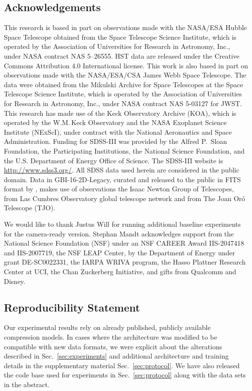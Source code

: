
\newpage

\subsection*{Acknowledgements}
This research is based in part on observations made with the NASA/ESA Hubble Space Telescope obtained from the Space Telescope Science Institute, which is operated by the Association of Universities for Research in Astronomy, Inc., under NASA contract NAS 5–26555. HST data are released under the Creative Commons Attribution 4.0 International license. This work is also based in part on observations made with the NASA/ESA/CSA James Webb Space Telescope. The data were obtained from the Mikulski Archive for Space Telescopes at the Space Telescope Science Institute, which is operated by the Association of Universities for Research in Astronomy, Inc., under NASA contract NAS 5-03127 for JWST. This research has made use of the Keck Observatory Archive (KOA), which is operated by the W.M.\,Keck Observatory and the NASA Exoplanet Science Institute (NExScI), under contract with the National Aeronautics and Space Administration. Funding for SDSS-III was provided by the Alfred P.\ Sloan Foundation, the Participating Institutions, the National Science Foundation, and the U.S. Department of Energy Office of Science. The SDSS-III website is \url{http://www.sdss3.org/}. All SDSS data used herein are considered in the public domain. Data in GBI-16-2D-Legacy, curated and released to the public in FITS format by \citet{maireles2023efficient}, makes use of observations the Isaac Newton Group of Telescopes, from Las Cumbres Observatory global telescope network and from The Joan Oró Telescope (TJO). 

We would like to thank Justus Will for running additional baseline experiments for the camera-ready version. Stephan Mandt acknowledges support from the National Science Foundation (NSF) under an NSF CAREER Award IIS-2047418 and IIS-2007719, the NSF LEAP Center, by the Department of Energy under grant DE-SC0022331, the IARPA WRIVA program, the Hasso Plattner Research Center at UCI, the Chan Zuckerberg Initiative, and gifts from Qualcomm and Disney.



\subsection*{Reproducibility Statement}
Our experimental results rely on already published, publicly available compression models. In cases where the architecture was modified to be compatible with new data formats, we were explicit about the alterations described in Sec.~\ref{sec:experiments} and additional architecture and training details in the supplementary material Sec.~\ref{sec:protocol}. We have also released the code base used for experiments in Sec.~\ref{sec:protocol} along with the data sets in the abstract.






\newpage
\appendix




